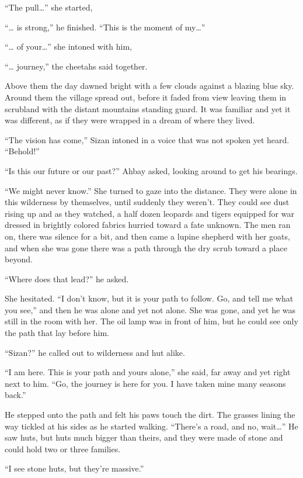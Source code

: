 ``The pull\ldots'' she started,

``\ldots{} is strong,'' he finished. ``This is the moment of my\ldots''

``\ldots{} of your\ldots'' she intoned with him,

``\ldots{} journey,'' the cheetahs said together.

Above them the day dawned bright with a few clouds against a blazing blue sky. Around them the village spread out, before it faded from view leaving them in scrubland with the distant mountains standing guard. It was familiar and yet it was different, as if they were wrapped in a dream of where they lived.

``The vision has come,'' Sizan intoned in a voice that was not spoken yet heard. ``Behold!''

``Is this our future or our past?'' Ahbay asked, looking around to get his bearings.

``We might never know.'' She turned to gaze into the distance. They were alone in this wilderness by themselves, until suddenly they weren't. They could see dust rising up and as they watched, a half dozen leopards and tigers equipped for war dressed in brightly colored fabrics hurried toward a fate unknown. The men ran on, there was silence for a bit, and then came a lupine shepherd with her goats, and when she was gone there was a path through the dry scrub toward a place beyond.

``Where does that lead?'' he asked.

She hesitated. ``I don't know, but it is your path to follow. Go, and tell me what you see,'' and then he was alone and yet not alone. She was gone, and yet he was still in the room with her. The oil lamp was in front of him, but he could see only the path that lay before him.

``Sizan?'' he called out to wilderness and hut alike.

``I am here. This is your path and yours alone,'' she said, far away and yet right next to him. ``Go, the journey is here for you. I have taken mine many seasons back.''

He stepped onto the path and felt his paws touch the dirt. The grasses lining the way tickled at his sides as he started walking. ``There's a road, and no, wait\ldots'' He saw huts, but huts much bigger than theirs, and they were made of stone and could hold two or three families.

``I see stone huts, but they're massive.''

